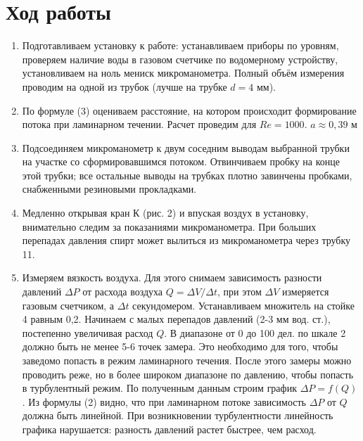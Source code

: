 \documentclass[a4paper, 12pt]{article}%
\begin{document}
\section*{Ход работы}
\begin{enumerate}
\item Подготавливаем установку к работе: устанавливаем приборы по уровням, проверяем наличие воды в газовом счетчике по водомерному устройству, установливаем на ноль мениск микроманометра. Полный объём измерения проводим на одной из трубок (лучше на трубке $d = 4$ мм).
\item По формуле (3) оцениваем расстояние, на котором происходит формирование потока при ламинарном течении. Расчет проведим для $Re
= 1000$. $a \approx 0,39$ м
\item Подсоединяем микроманометр к двум соседним выводам выбранной трубки на участке со сформировавшимся потоком. Отвинчиваем пробку на конце этой трубки; все остальные выводы на трубках плотно завинчены пробками, снабженными резиновыми прокладками.
\item Медленно открывая кран К (рис. 2) и впуская воздух в установку, внимательно следим за показаниями микроманометра. При больших перепадах давления спирт может вылиться из микроманометра через трубку 11.
\item Измеряем вязкость воздуха. Для этого снимаем зависимость разности давлений $\Delta P$ от расхода воздуха $Q =\Delta V/ \Delta t$, при этом $\Delta V$ измеряется газовым счетчиком, а $\Delta t$ секундомером. Устанавливаем множитель на стойке 4 равным 0,2. Начинаем с малых перепадов давлений (2-3 мм вод. ст.), постепенно увеличивая расход $Q$. В диапазоне от 0 до 100 дел. по шкале 2 должно быть не менее 5-6 точек замера. Это необходимо для того, чтобы заведомо попасть в режим ламинарного течения. После этого замеры можно проводить реже, но в более широком диапазоне по давлению, чтобы попасть в турбулентный режим. По полученным данным строим график $\Delta P = f(Q)$. Из формулы (2) видно, что при ламинарном потоке зависимость $\Delta P$ от $Q$ должна быть линейной. При возникновении турбулентности линейность графика нарушается: разность давлений растет быстрее, чем расход.


\end{enumerate}
\end{document}
